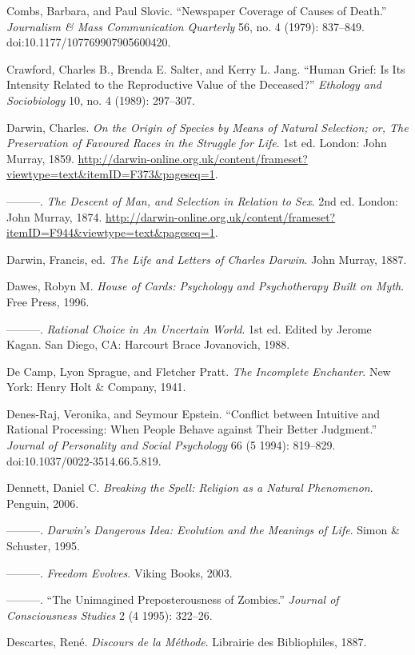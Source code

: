 \documentclass[letterpaper]{book}
\begin{document}
{
 Combs, Barbara, and Paul Slovic. ``Newspaper
Coverage of Causes of Death.'' \textit{Journalism \&
Mass Communication Quarterly} 56, no. 4 (1979): 837--849.
doi:10.1177/107769907905600420.}

{
 Crawford, Charles B., Brenda E. Salter, and Kerry L. Jang.
``Human Grief: Is Its Intensity Related to the
Reproductive Value of the Deceased?''
\textit{Ethology and Sociobiology} 10, no. 4 (1989): 297--307.}

{
 Darwin, Charles. \textit{On the Origin of Species by Means of
Natural Selection; or, The Preservation of Favoured Races in the
Struggle for Life}. 1st ed. London: John Murray, 1859.
\url{http://darwin-online.org.uk/content/frameset?viewtype=text\&itemID=F373\&pageseq=1}.}

{
 {}---{}---{}---. \textit{The Descent of Man, and Selection in
Relation to Sex}. 2nd ed. London: John Murray, 1874.
\url{http://darwin-online.org.uk/content/frameset?itemID=F944\&viewtype=text\&pageseq=1}.}

{
 Darwin, Francis, ed. \textit{The Life and Letters of Charles
Darwin}. John Murray, 1887.}

{
 Dawes, Robyn M. \textit{House of Cards: Psychology and
Psychotherapy Built on Myth}. Free Press, 1996.}

{
 {}---{}---{}---. \textit{Rational Choice in An Uncertain World}.
1st ed. Edited by Jerome Kagan. San Diego, CA: Harcourt Brace
Jovanovich, 1988.}

{
 De Camp, Lyon Sprague, and Fletcher Pratt. \textit{The Incomplete
Enchanter}. New York: Henry Holt \& Company, 1941.}

{
 Denes-Raj, Veronika, and Seymour Epstein.
``Conflict between Intuitive and Rational Processing:
When People Behave against Their Better Judgment.''
\textit{Journal of Personality and Social Psychology} 66 (5 1994):
819--829. doi:10.1037/0022-3514.66.5.819.}

{
 Dennett, Daniel C. \textit{Breaking the Spell: Religion as a
Natural Phenomenon}. Penguin, 2006.}

{
 {}---{}---{}---. \textit{Darwin's Dangerous Idea:
Evolution and the Meanings of Life}. Simon \& Schuster, 1995.}

{
 {}---{}---{}---. \textit{Freedom Evolves}. Viking Books, 2003.}

{
 {}---{}---{}---. ``The Unimagined
Preposterousness of Zombies.'' \textit{Journal of
Consciousness Studies} 2 (4 1995): 322--26.}

{
 Descartes, René. \textit{Discours de la Méthode}. Librairie des
Bibliophiles, 1887.}
\end{document}
